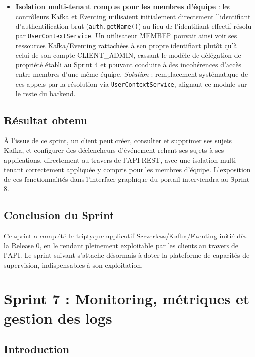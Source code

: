 \begin{itemize}
    \item \textbf{Isolation multi-tenant rompue pour les membres d'équipe} : les contrôleurs Kafka et Eventing utilisaient initialement directement l'identifiant d'authentification brut (\texttt{auth.getName()}) au lieu de l'identifiant effectif résolu par \texttt{UserContextService}. Un utilisateur MEMBER pouvait ainsi voir ses ressources Kafka/Eventing rattachées à son propre identifiant plutôt qu'à celui de son compte CLIENT\_ADMIN, cassant le modèle de délégation de propriété établi au Sprint 4 et pouvant conduire à des incohérences d'accès entre membres d'une même équipe. \textit{Solution} : remplacement systématique de ces appels par la résolution via \texttt{UserContextService}, alignant ce module sur le reste du backend.
\end{itemize}

\subsection{Résultat obtenu}

À l'issue de ce sprint, un client peut créer, consulter et supprimer ses sujets Kafka, et configurer des déclencheurs d'événement reliant ses sujets à ses applications, directement au travers de l'API REST, avec une isolation multi-tenant correctement appliquée y compris pour les membres d'équipe. L'exposition de ces fonctionnalités dans l'interface graphique du portail interviendra au Sprint 8.

\subsection{Conclusion du Sprint}

Ce sprint a complété le triptyque applicatif Serverless/Kafka/Eventing initié dès la Release 0, en le rendant pleinement exploitable par les clients au travers de l'API. Le sprint suivant s'attache désormais à doter la plateforme de capacités de supervision, indispensables à son exploitation.


\section{Sprint 7 : Monitoring, métriques et gestion des logs}

\subsection{Introduction}

